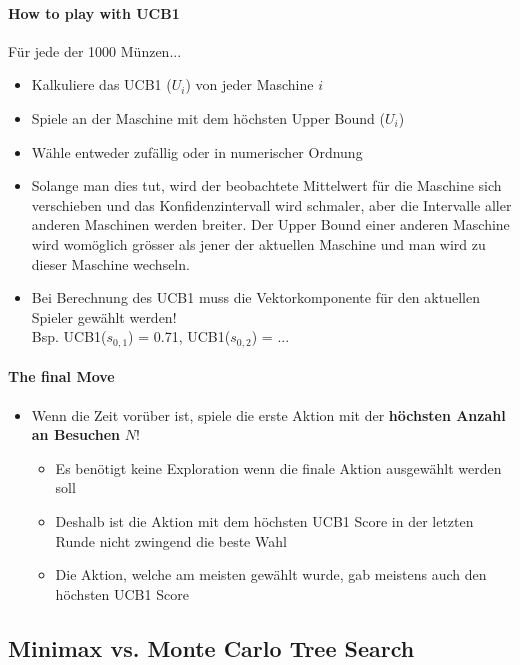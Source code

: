 \documentclass[a4paper]{article}
\begin{document}
		\paragraph{How to play with UCB1}
		Für jede der 1000 Münzen...
		\begin{itemize}
			\item Kalkuliere das UCB1 ($U_{i}$) von jeder Maschine $i$
			\item Spiele an der Maschine mit dem höchsten Upper Bound ($U_{i}$)
			\item Wähle entweder zufällig oder in numerischer Ordnung
			\item Solange man dies tut, wird der beobachtete Mittelwert für die Maschine sich verschieben und das Konfidenzintervall wird schmaler, aber die Intervalle aller anderen Maschinen werden breiter.
			Der Upper Bound einer anderen Maschine wird womöglich grösser als jener der aktuellen Maschine und man wird zu dieser Maschine wechseln.
			\item Bei Berechnung des UCB1 muss die Vektorkomponente für den aktuellen Spieler gewählt werden! \\
				Bsp. UCB1($s_{0,1}$) = 0.71, UCB1($s_{0,2}$) = ...
		\end{itemize}
	
		\paragraph{The final Move}
		
		\begin{itemize}
			\item Wenn die Zeit vorüber ist, spiele die erste Aktion mit der \textbf{höchsten Anzahl an Besuchen }$N$!
			\begin{itemize}
				\item Es benötigt keine Exploration wenn die finale Aktion ausgewählt werden soll
				\item Deshalb ist die Aktion mit dem höchsten UCB1 Score in der letzten Runde nicht zwingend die beste Wahl
				\item Die Aktion, welche am meisten gewählt wurde, gab meistens auch den höchsten UCB1 Score
			\end{itemize} 
		\end{itemize}
		
		\subsection{Minimax vs. Monte Carlo Tree Search}
		
\end{document}
